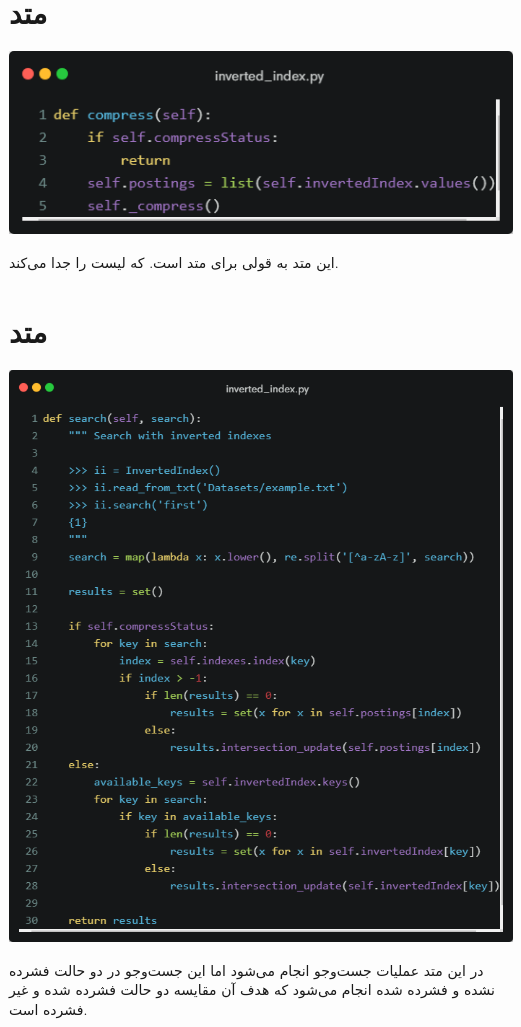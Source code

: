 \documentclass[12pt, dvipsnames, svgnames, x11names,]{article}
\begin{document}
		
	\section{متد }
		
		\includegraphics[width=14cm]{images/8.png} \par
		\vspace{0.5cm}
		{\normalsize 
			این متد به قولی  برای متد است. که لیست  را جدا می‌کند.
		}		
		
		
	\section{متد }
		
		\includegraphics[width=14cm]{images/9.png} \par
		\vspace{0.5cm}
		{\normalsize 
		در این متد عملیات جست‌وجو انجام می‌شود اما این جست‌وجو در دو حالت فشرده نشده و فشرده شده انجام می‌شود که هدف آن مقایسه دو حالت فشرده شده و غیر فشرده است.
		}		
		
\end{document}

